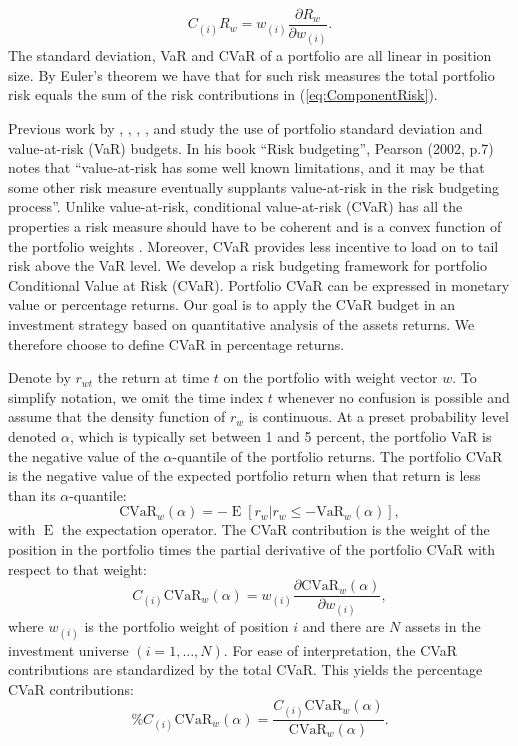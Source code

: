 \documentclass[12pt,a4paper]{article}
\DeclareMathOperator{\E}{\operatorname{E}}
\begin{document}
\begin{equation}  C_{(i)}R_w = w_{(i)}\frac{\partial R_w}{\partial w_{(i)}}. \label{eq:ComponentRisk}\end{equation}
The standard deviation, VaR and CVaR of a portfolio are all linear in position size. By Euler's theorem we have that for such risk measures the total portfolio risk equals the sum of the risk contributions in (\ref{eq:ComponentRisk}).


Previous work by \citet{Chow2001}, \citet{Litterman1996}, \citet{Maillard2010}, \citet{Peterson2008}, and \citet{Scherer2007} study the use of portfolio standard deviation and value-at-risk (VaR) budgets. In his book ``Risk budgeting'', \nocite{Pearson2002} Pearson (2002, p.7) notes that ``value-at-risk has some well known limitations, and it may be that some other risk measure eventually supplants value-at-risk in the risk budgeting process''. Unlike value-at-risk, conditional value-at-risk (CVaR) has all the properties a risk measure should have to be coherent and is a convex function of the portfolio weights \citep{Artzner1999, Pflug2000}. Moreover, CVaR provides less incentive to load on to tail risk above the VaR level.
We develop a risk budgeting framework for portfolio Conditional Value at Risk (CVaR). Portfolio CVaR can be expressed in monetary value or percentage returns. Our goal is to apply the CVaR budget in an investment strategy based on quantitative analysis of the assets returns. We therefore choose to define CVaR in percentage returns.

Denote by $r_{wt}$  the return at time $t$  on the portfolio with weight vector $w$. To simplify notation, we omit the time index $t$ whenever no confusion is possible and assume that the density function of $r_w$ is continuous. At a preset probability level denoted $\alpha$, which is typically set between 1 and 5 percent, the portfolio VaR is the negative value of the  $\alpha$-quantile of the portfolio returns. The portfolio CVaR is the negative value of the expected portfolio return when that return is less than its  $\alpha$-quantile:
\begin{equation} \mbox{CVaR}_w(\alpha) = - \E[r_w | r_w \leq -\mbox{VaR}_w(\alpha)], \label{eq:CVaR} \end{equation} with $\E$ the expectation operator. The CVaR contribution is the weight of the position in the portfolio times the partial derivative of the portfolio CVaR with respect to that weight:
\begin{equation} C_{(i)}\mbox{CVaR}_w(\alpha) = w_{(i)} \frac{ \partial  \mbox{CVaR}_w(\alpha) }{\partial w_{(i)}} , \label{eq:CVaR} \end{equation}
where $w_{(i)}$  is the portfolio weight of position $i$  and there are $N$ assets in the investment universe $(i=1,\ldots,N).$
For ease of interpretation, the CVaR contributions are standardized by the total CVaR. This yields the percentage CVaR contributions:
\begin{equation}  \%C_{(i)}\mbox{CVaR}_w(\alpha) = \frac{C_{(i)}\mbox{CVaR}_w(\alpha) }{\mbox{CVaR}_w(\alpha)} .\label{eq:PercCVaR} \end{equation}
\end{document}
